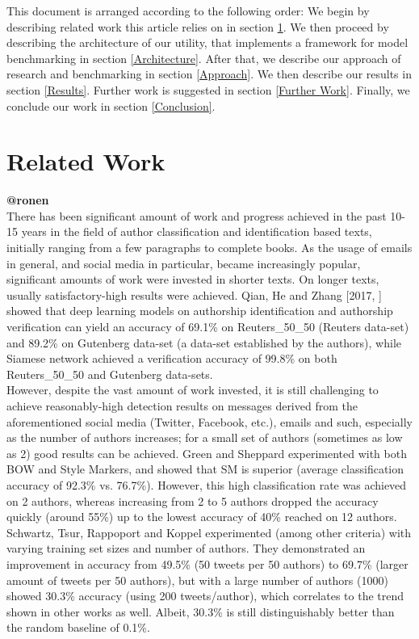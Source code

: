 \documentclass[a4paper]{article}
\begin{document}
This document is arranged according to the following order:
We begin by describing related work this article relies on in section \ref{Related Work}.
We then proceed by describing the architecture of our utility, that implements a framework for model benchmarking in section \ref{Architecture}.
After that, we describe our approach of research and benchmarking in section \ref{Approach}.
We then describe our results in section \ref{Results}.
Further work is suggested in section \ref{Further Work}.
Finally, we conclude our work in section \ref{Conclusion}.
\section{Related Work}
\label{Related Work}
\textbf{@ronen}\\

There has been significant amount of work and progress achieved in the past 10-15 years in the field of author classification and identification based texts, initially ranging from a few paragraphs to complete books. As the usage of emails in general, and social media in particular, became increasingly popular, significant amounts of work were invested in shorter texts.
On longer texts, usually satisfactory-high results were achieved. Qian, He and Zhang [2017, \cite{qian}] showed that deep learning models on authorship identification and authorship verification can yield an accuracy of 69.1\% on Reuters\_50\_50 (Reuters data-set) and 89.2\% on Gutenberg data-set (a data-set established by the authors), while Siamese network achieved a verification accuracy of 99.8\% on both Reuters\_50\_50 and Gutenberg data-sets.\\
However, despite the vast amount of work invested, it is still challenging to achieve reasonably-high detection results on messages derived from the aforementioned social media (Twitter, Facebook, etc.), emails and such, especially as the number of authors increases; for a small set of authors (sometimes as low as 2) good results can be achieved. Green and Sheppard \cite{rachel} experimented with both BOW and Style Markers, and showed that SM is superior (average classification accuracy of 92.3\% vs. 76.7\%). However, this high classification rate was achieved on 2 authors, whereas increasing from 2 to 5 authors dropped the accuracy quickly (around 55\%) up to the lowest accuracy of 40\% reached on 12 authors.
Schwartz, Tsur, Rappoport and Koppel \cite{schwartz} experimented (among other criteria) with varying training set sizes and number of authors. They demonstrated an improvement in accuracy from 49.5\% (50 tweets per 50 authors) to 69.7\% (larger amount of tweets per 50 authors), but with a large number of authors (1000) showed 30.3\% accuracy (using 200 tweets/author), which correlates to the trend shown in other works as well. Albeit, 30.3\% is still  distinguishably better than the random baseline of 0.1\%.
\end{document}
